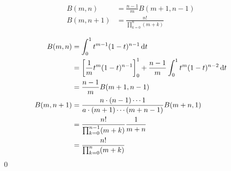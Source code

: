 \documentclass[uplatex,dvipdfmx,a4paper,11pt]{jlreq}
\makeatletter
\theoremstyle{definition}
\renewenvironment{proof}[1][\proofname]{\par
  \normalfont
  \topsep6\p@\@plus6\p@ \trivlist
  \item[\hskip\labelsep{\bfseries #1}\@addpunct{\bfseries}]\ignorespaces\quad\par
}{%
  \qed\endtrivlist\@endpefalse
}
\renewcommand\proofname{証明}
\makeatother
\begin{document}
\begin{theorem}
  \begin{align}
    B(m, n)     & = \frac{n - 1}{m}B(m + 1, n - 1)  \\
    B(m, n + 1) & = \frac{n!}{\prod_{k=0}^n(m + k)}
  \end{align}
\end{theorem}
\begin{proof}
  \begin{align}
    B(m, n)     & = \int_{0}^{1}t^{m-1}(1-t)^{n-1}\dd{t}                                                \\
                & = \qty[\frac{1}{m}t^m(1-t)^{n-1}]_0^1 + \frac{n-1}{m}\int_{0}^{1}t^m(1-t)^{n-2}\dd{t} \\
                & = \frac{n - 1}{m}B(m + 1, n - 1)                                                      \\
    B(m, n + 1) & = \frac{n\cdot(n - 1)\cdots 1}{a\cdot(m + 1)\cdots(m + n - 1)}B(m + n, 1)             \\
                & = \frac{n!}{\prod_{k = 0}^{n-1}(m + k)}\frac{1}{m + n}                                \\
                & = \frac{n!}{\prod_{k = 0}^{n}(m + k)}
  \end{align}
\end{proof}
\end{document}
